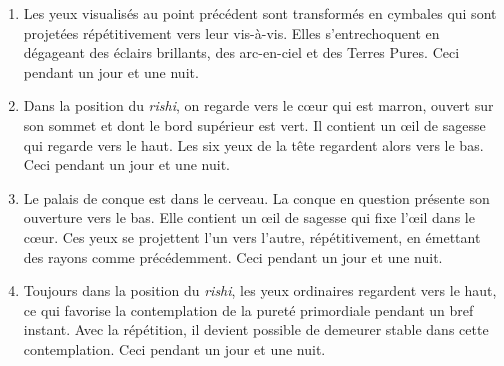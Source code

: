 \documentclass[11pt,a4paper]{article}
\begin{document}
\begin{itemize}
\begin{enumerate}
    \item Les yeux visualisés au point précédent sont transformés en
    cymbales qui sont projetées répétitivement vers leur
    vis\hyp{}à\hyp{}vis. Elles s'entrechoquent en dégageant des
    éclairs brillants, des arc\hyp{}en\hyp{}ciel et des Terres
    Pures. Ceci pendant un jour et une nuit.

    \item Dans la position du \emph{rishi}, on regarde vers le
    c{\oe}ur qui est marron, ouvert sur son sommet et dont le bord
    supérieur est vert. Il contient un {\oe}il de sagesse qui regarde
    vers le haut. Les six yeux de la tête regardent alors vers le
    bas. Ceci pendant un jour et une nuit.

    \item Le palais de conque est dans le cerveau. La conque en
    question présente son ouverture vers le bas. Elle contient un
    {\oe}il de sagesse qui fixe l'{\oe}il dans le c{\oe}ur. Ces yeux
    se projettent l'un vers l'autre, répétitivement, en émettant des
    rayons comme précédemment. Ceci pendant un jour et une nuit.

   \item Toujours dans la position du \emph{rishi}, les yeux
   ordinaires regardent vers le haut, ce qui favorise la contemplation
   de la pureté primordiale pendant un bref instant. Avec la
   répétition, il devient possible de demeurer stable dans cette
   contemplation. Ceci pendant un jour et une nuit.

  \end{enumerate}

\end{itemize}
\end{document}
